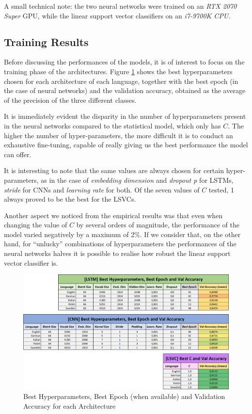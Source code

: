 \documentclass[letterpaper,11pt]{article}
\begin{document}
A small technical note: the two neural networks were trained on an \textit{RTX 2070 Super} GPU, while the linear support vector classifiers on an \textit{i7-9700K CPU}.

\subsection{Training Results}

Before discussing the performances of the models, it is of interest to focus on the training phase of the architectures. Figure \ref{fig:hyperparam_epoch_res} shows the best hyperparameters chosen for each architecture of each language, together with the best epoch (in the case of neural networks) and the validation accuracy, obtained as the average of the precision of the three different classes.

It is immediately evident the disparity in the number of hyperparameters present in the neural networks compared to the statistical model, which only has $C$. The higher the number of hyper-parameters, the more difficult it is to conduct an exhaustive fine-tuning, capable of really giving us the best performance the model can offer. 

It is interesting to note that the same values are always chosen for certain hyper-parameters, as in the case of \textit{embedding dimension} and \textit{dropout p} for LSTMs, \textit{stride} for CNNs and \textit{learning rate} for both. Of the seven values of $C$ tested, 1 always proved to be the best for the LSVCs. 

Another aspect we noticed from the empirical results was that even when changing the value of $C$ by several orders of magnitude, the performance of the model varied negatively by a maximum of 2\%. If we consider that, on the other hand, for ``unlucky'' combinations of hyperparameters the performances of the neural networks halves it is possible to realise how robust the linear support vector classifier is.

\begin{figure}[H]
  \centering
  \includegraphics[width=\textwidth]{hyperparam_res.png}
  \caption{Best Hyperparameters, Best Epoch (when available) and Validation Accuracy for each Architecture}
  \label{fig:hyperparam_epoch_res}
\end{figure}
\end{document}

